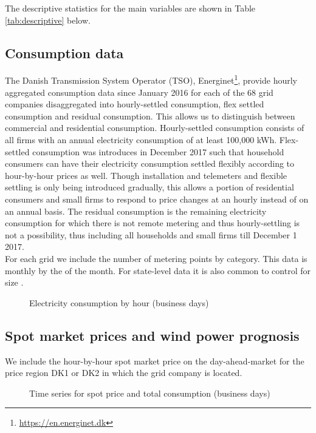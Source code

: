 \label{sec:data}
The descriptive statistics for the main variables are shown in Table \ref{tab:descriptive} below.

\subsection{Consumption data}
\label{subsec:d_consumption}
The Danish Transmission System Operator (TSO), Energinet\footnote{\url{https://en.energinet.dk}}, provide hourly aggregated consumption data since January 2016 for each of the 68 grid companies disaggregated into hourly-settled consumption, flex settled consumption and residual consumption. This allows us to distinguish between commercial and residential consumption. Hourly-settled consumption consists of all firms with an annual electricity consumption of at least 100,000 kWh. Flex-settled consumption was introduces in December 2017 such that household consumers can have their electricity consumption settled flexibly according to hour-by-hour prices as well. Though installation and telemeters and flexible settling is only being introduced gradually, this allows a portion of residential consumers and small firms to respond to price changes at an hourly instead of on an annual basis. The residual consumption is the remaining electricity consumption for which there is not remote metering and thus hourly-settling is not a possibility, thus including all households and small firms till December 1 2017.
\medskip\\
For each grid we include the number of metering points by category. This data is monthly by the  of the month. For state-level data it is also common to control for size \citep{burke2017price}.
\begin{figure}[H]
  \centering
  \caption{Electricity consumption by hour (business days)}
  \label{fig:cons_hour}
\end{figure}


\subsection{Spot market prices and wind power prognosis}
\label{subsec:d_spot}
We include the hour-by-hour spot market price on the day-ahead-market for the price region DK1 or DK2 in which the grid company is located.
\begin{figure}[H]
  \centering
  \caption{Time series for spot price and total consumption (business days)}
  \label{fig:price_cons_time_series}
\end{figure}

